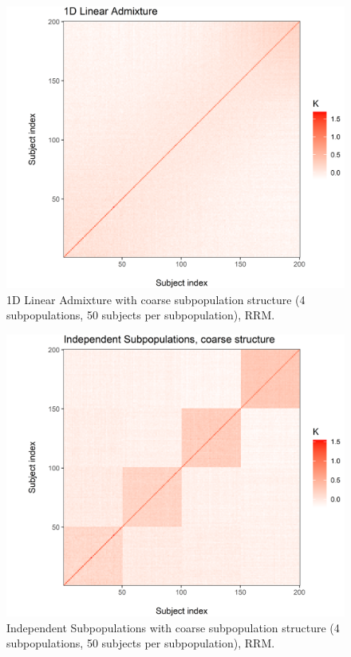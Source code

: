 
\begin{figure}[H]
    \centering
    \includegraphics[scale = 1]{figures/figure_07.png}
    \caption{1D Linear Admixture with coarse subpopulation structure (4 subpopulations, 50 subjects per subpopulation), RRM.}
    \label{fig:admixed}
\end{figure}

\begin{figure}[H]
    \centering
    \includegraphics[scale = 1]{figures/figure_08.png}
    \caption{Independent Subpopulations with coarse subpopulation structure (4 subpopulations, 50 subjects per subpopulation), RRM.}
    \label{fig:indep_coarse}
\end{figure}

